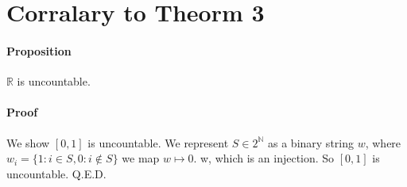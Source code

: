\documentclass{article}
\begin{document}
\section{Corralary to Theorm 3}
\paragraph{Proposition}$\mathbb{R}$ is uncountable.
\paragraph{Proof} We show $[0,1]$ is uncountable. We represent $S\in 2^\mathbb{N}$ as a binary string $w$, where $w_i = \{1: i\in S, 0: i \notin S\}$ we map $w\mapsto 0$. w, which is an injection. So $[0,1]$ is uncountable. Q.E.D.
\end{document}
